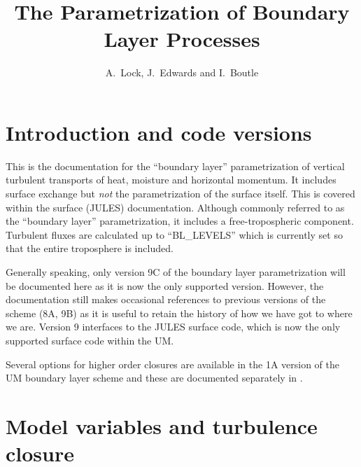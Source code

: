 \documentclass{UMDP_article}
\title{The Parametrization of Boundary Layer Processes}
\author{A.~Lock, J.~Edwards and I.~Boutle}
\begin{document}
 
\maketitle

\tableofcontents

\newpage

\section{Introduction and code versions}

This is the documentation for the ``boundary layer'' parametrization
of vertical turbulent transports of heat, moisture and horizontal
momentum.  It includes surface exchange but \emph{not} the
parametrization of the surface itself.  This is covered within the
surface (JULES) documentation.  Although commonly referred to as the
``boundary layer'' parametrization, it includes a free-tropospheric
component.  Turbulent fluxes are calculated up to ``BL\_LEVELS'' which
is currently set so that the entire troposphere is included.

Generally speaking, only version 9C of the boundary layer
parametrization will be documented here as it is now the only
supported version. However, the documentation still makes occasional
references to previous versions of the scheme (8A, 9B) as it is useful
to retain the history of how we have got to where we are. Version 9
interfaces to the JULES surface code, which is now the only supported
surface code within the UM.

Several options for higher order closures are available in the 1A
version of the UM boundary layer scheme and these are documented
separately in .

\section{Model variables and turbulence closure}
\label{sec:closure}
\end{document}
